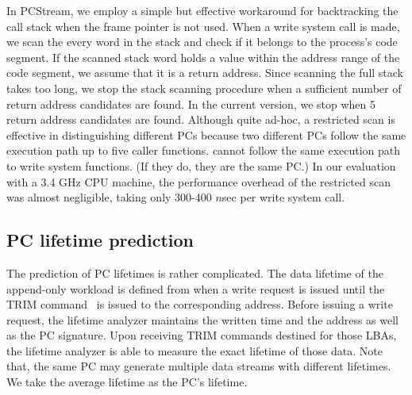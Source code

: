 In \textsf{\small PCStream}, we employ a simple but effective workaround 
for backtracking the call stack when the frame pointer is not used.
When a write system call is made, we scan the every word in the stack and check
if it belongs to the process's code segment.  If the scanned stack word holds a
value within the address range of the code segment, we assume that it is a
return address.  Since scanning the full stack takes too long, we stop the
stack scanning procedure when a sufficient number of return address candidates
are found.  In the current version, we stop when 5 return address candidates
are found.  Although quite ad-hoc, a restricted scan is effective in
distinguishing different PCs because two different PCs
follow the same execution path up to five caller functions.   
cannot follow the same execution path to write system functions.  
(If they do, they are the same PC.) In our evaluation
with a 3.4 GHz CPU machine, the performance overhead of the restricted scan was
almost negligible, taking only 300-400 $n$sec per write system call.



\vspace{-10pt}
\subsection{PC lifetime prediction}
The prediction of PC lifetimes is rather complicated. 
The data lifetime of the append-only workload is defined 
from when a write request is issued until the TRIM command~\cite{TRIM} is issued to 
the corresponding address.
Before issuing a write request, the lifetime analyzer
maintains the written time and the address as well as the PC signature.
Upon receiving TRIM
commands destined for those LBAs, the lifetime analyzer is able to measure the
exact lifetime of those data. 
Note that, the
same PC may generate multiple data streams with different lifetimes.
We take the average lifetime as the PC's lifetime.

\vspace{-8pt}
